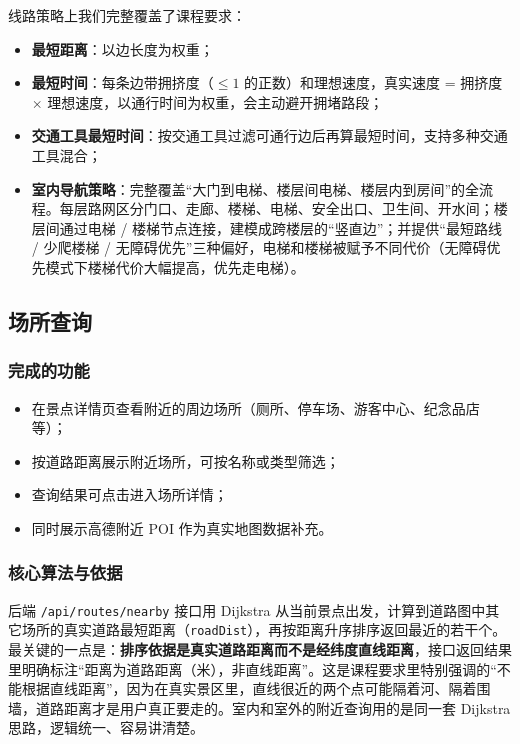\documentclass[UTF8,a4paper,12pt]{ctexart}
\begin{document}
线路策略上我们完整覆盖了课程要求：
\begin{itemize}
\item \textbf{最短距离}：以边长度为权重；
\item \textbf{最短时间}：每条边带拥挤度（$\le 1$ 的正数）和理想速度，真实速度 = 拥挤度 $\times$ 理想速度，以通行时间为权重，会主动避开拥堵路段；
\item \textbf{交通工具最短时间}：按交通工具过滤可通行边后再算最短时间，支持多种交通工具混合；
\item \textbf{室内导航策略}：完整覆盖“大门到电梯、楼层间电梯、楼层内到房间”的全流程。每层路网区分门口、走廊、楼梯、电梯、安全出口、卫生间、开水间；楼层间通过电梯 / 楼梯节点连接，建模成跨楼层的“竖直边”；并提供“最短路线 / 少爬楼梯 / 无障碍优先”三种偏好，电梯和楼梯被赋予不同代价（无障碍优先模式下楼梯代价大幅提高，优先走电梯）。
\end{itemize}

\subsection{场所查询}

\subsubsection{完成的功能}
\begin{itemize}
\item 在景点详情页查看附近的周边场所（厕所、停车场、游客中心、纪念品店等）；
\item 按道路距离展示附近场所，可按名称或类型筛选；
\item 查询结果可点击进入场所详情；
\item 同时展示高德附近 POI 作为真实地图数据补充。
\end{itemize}

\subsubsection{核心算法与依据}
后端 \texttt{/api/routes/nearby} 接口用 Dijkstra 从当前景点出发，计算到道路图中其它场所的真实道路最短距离（\texttt{roadDist}），再按距离升序排序返回最近的若干个。最关键的一点是：\textbf{排序依据是真实道路距离而不是经纬度直线距离}，接口返回结果里明确标注“距离为道路距离（米），非直线距离”。这是课程要求里特别强调的“不能根据直线距离”，因为在真实景区里，直线很近的两个点可能隔着河、隔着围墙，道路距离才是用户真正要走的。室内和室外的附近查询用的是同一套 Dijkstra 思路，逻辑统一、容易讲清楚。
\end{document}
